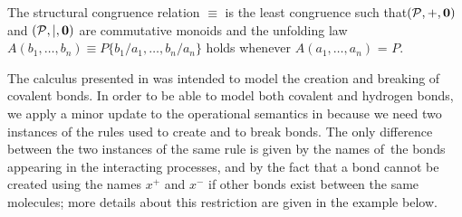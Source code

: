 \documentclass[runningheads]{llncs}
\newcommand{\mP}{\mathcal{P}}
\begin{document}
The structural congruence relation $\equiv$ is the least congruence such 
that\linebreak $(\mP,+,{\bf 0})$ and $(\mP,\mid,{\bf 0})$ are commutative monoids 
and the unfolding law\linebreak  $A(b_1,\ldots,b_n) \equiv 
P\{b_1/a_1,\ldots,b_n/a_n\}$ holds whenever $A(a_1,\ldots,a_n)$ = $P$.

The calculus presented in \cite{NaCo18} was intended to model the 
creation and breaking of covalent bonds. In order to be able to model 
both covalent and hydrogen bonds, we apply a minor update to the 
operational semantics in \cite{NaCo18} because we need two instances of the 
rules used to create and to break bonds. The only difference between the 
two instances of the same rule is given by the names of~the bonds 
appearing in the interacting processes, and by the fact that a bond cannot 
be created using the names $x^+$ and $x^-$ if other bonds exist between 
the same molecules; more details about this restriction are given in 
the example below.
\end{document}

